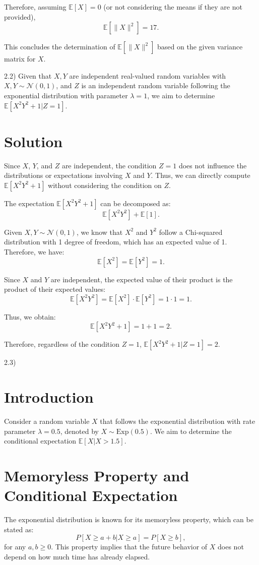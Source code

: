 \documentclass{article}
\begin{document}
Therefore, assuming \(\mathbb{E}[X] = 0\) (or not considering the means if they are not provided),
\[ \mathbb{E}[\|X\|^2] = 17. \]

This concludes the determination of \(\mathbb{E}[\|X\|^2]\) based on the given variance matrix for \(X\).

2.2)
Given that \(X, Y\) are independent real-valued random variables with \(X, Y \sim \mathcal{N}(0, 1)\), and \(Z\) is an independent random variable following the exponential distribution with parameter \(\lambda = 1\), we aim to determine \(\mathbb{E}[X^2Y^2 + 1 | Z = 1]\).

\section*{Solution}

Since \(X\), \(Y\), and \(Z\) are independent, the condition \(Z = 1\) does not influence the distributions or expectations involving \(X\) and \(Y\). Thus, we can directly compute \(\mathbb{E}[X^2Y^2 + 1]\) without considering the condition on \(Z\).

The expectation \(\mathbb{E}[X^2Y^2 + 1]\) can be decomposed as:
\[ \mathbb{E}[X^2Y^2] + \mathbb{E}[1]. \]

Given \(X, Y \sim \mathcal{N}(0, 1)\), we know that \(X^2\) and \(Y^2\) follow a Chi-squared distribution with 1 degree of freedom, which has an expected value of 1. Therefore, we have:
\[ \mathbb{E}[X^2] = \mathbb{E}[Y^2] = 1. \]

Since \(X\) and \(Y\) are independent, the expected value of their product is the product of their expected values:
\[ \mathbb{E}[X^2Y^2] = \mathbb{E}[X^2] \cdot \mathbb{E}[Y^2] = 1 \cdot 1 = 1. \]

Thus, we obtain:
\[ \mathbb{E}[X^2Y^2 + 1] = 1 + 1 = 2. \]

Therefore, regardless of the condition \(Z = 1\), \(\mathbb{E}[X^2Y^2 + 1 | Z = 1] = 2\).

2.3)
\section*{Introduction}
Consider a random variable \(X\) that follows the exponential distribution with rate parameter \(\lambda = 0.5\), denoted by \(X \sim \text{Exp}(0.5)\). We aim to determine the conditional expectation \(\mathbb{E}[X | X > 1.5]\).

\section*{Memoryless Property and Conditional Expectation}
The exponential distribution is known for its memoryless property, which can be stated as:
\[ P[X \geq a + b | X \geq a] = P[X \geq b], \]
for any \(a, b \geq 0\). This property implies that the future behavior of \(X\) does not depend on how much time has already elapsed.
\end{document}
